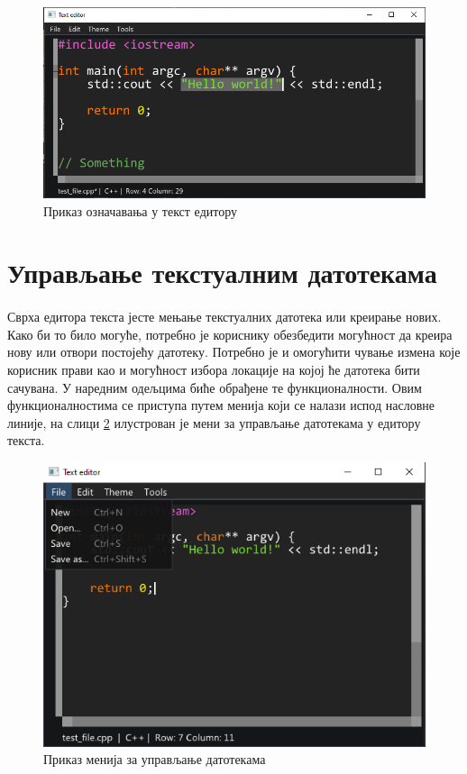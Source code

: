 \documentclass[12pt,oneside]{memoir}
\begin{document}
\begin{figure}[!ht]
	\centering
	\includegraphics[width=1.0\textwidth]{images/selection.png}
	\caption{Приказ означавања у текст едитору}
	\label{fig:selection}
\end{figure}

\section{Управљање текстуалним датотекама}
\paragraph{}
Сврха едитора текста јесте мењање текстуалних датотека или креирање нових. 
Како би то било могуће, потребно је кориснику обезбедити могућност да креира нову или 
отвори постојећу датотеку. Потребно је и омогућити чување измена које корисник
прави као и могућност избора локације на којој ће датотека бити сачувана. У наредним 
одељцима биће обрађене те функционалности. Овим функционалностима се приступа путем
менија који се налази испод насловне линије, на слици \ref{fig:file_menu} илустрован је мени за управљање датотекама у едитору текста.

\begin{figure}[!ht]
	\centering
	\includegraphics[width=1.0\textwidth]{images/file_menu.png}
	\caption{Приказ менија за управљање датотекама}
	\label{fig:file_menu}
\end{figure}
\end{document}
